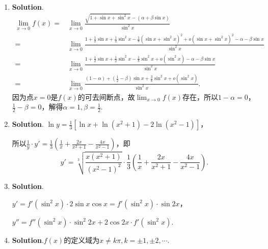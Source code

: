 \documentclass[../main.tex]{subfiles}
\begin{document}
\begin{enumerate}
    \item \textbf{Solution}.
          \[
              \begin{aligned}
                  \lim_{x\to0}f(x)= {} & \lim_{x\to0}\frac{\sqrt{1+\sin x+\sin^2 x}-(\alpha+\beta\sin x)}{\sin^2 x}                                                                  \\
                  = {}                 & \lim_{x\to0}\frac{1+\frac{1}{2}\sin x+\frac{1}{2}\sin^2 x-\frac{1}{8}(\sin x+\sin^2 x)^2+o(\sin x+\sin^2 x)^2-\alpha-\beta\sin x}{\sin^2 x} \\
                  = {}                 & \lim_{x\to0}\frac{1+\frac{1}{2}\sin x+\frac{1}{2}\sin^2 x-\frac{1}{8}\sin^2 x+o(\sin^2 x)-\alpha-\beta\sin x}{\sin^2 x}                     \\
                  = {}                 & \lim_{x\to0}\frac{(1-\alpha)+(\frac{1}{2}-\beta)\sin x+\frac{3}{8}\sin^2 x+o(\sin^2 x)}{\sin^2 x}.
              \end{aligned}
          \]
          因为点$x=0$是$f(x)$的可去间断点，故$\lim_{x\to0}f(x)$存在，所以$1-\alpha=0$，$\frac{1}{2}
              -\beta=0$，解得$\alpha=1,\beta=\frac{1}{2}$.

    \item \textbf{Solution}. $\ln y=\frac{1}{3}\left[\ln x+\ln(x^{2}+1)-2\ln(x^{2}
                  -1)\right]$，

          所以$\frac{1}{y}\cdot y'=\frac{1}{3}\left(\frac{1}{x}+\frac{2x}{x^{2}+1}-\frac{4x}{x^{2}-1}
              \right)$，即
          \[
              y'=\sqrt[3]{\frac{x(x^{2}+1)}{(x^{2}-1)^{2}}}\cdot\frac{1}{3}\left(\frac{1}{x}
              +\frac{2x}{x^{2}+1}-\frac{4x}{x^{2}-1}\right).
          \]

    \item \textbf{Solution}.

          $y'=f'(\sin^{2}x)\cdot2\sin x\cos x=f'(\sin^{2}x)\cdot\sin 2x$，

          $y''=f''(\sin^{2}x)\cdot\sin^{2}2x+2\cos 2x\cdot f'(\sin^{2}x)$.

    \item \textbf{Solution}.$f(x)$的定义域为$x\neq k\pi,k=\pm1, \pm2,\cdots$.


\end{enumerate}
\end{document}
